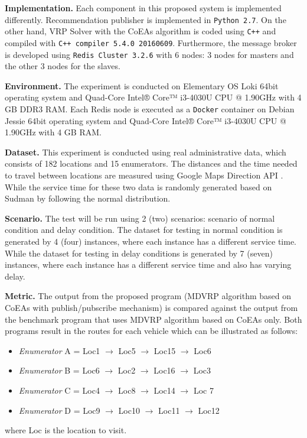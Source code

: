 \documentclass[conference]{IEEEtran}
\begin{document}
\textbf{Implementation.} Each component in this proposed system is implemented differently. Recommendation publisher is implemented in \verb!Python 2.7!. On the other hand, VRP Solver with the CoEAs algorithm is coded using \verb!C++! and compiled with \verb!C++ compiler 5.4.0 20160609!. Furthermore, the message broker is developed using \verb|Redis Cluster 3.2.6| with 6 nodes: 3 nodes for masters and the other 3 nodes for the slaves.

\textbf{Environment.} The experiment is conducted on Elementary OS Loki 64bit operating system and Quad-Core Intel® Core™ i3-4030U CPU @ 1.90GHz with 4 GB DDR3 RAM. Each Redis node is executed as a \verb|Docker| container on Debian Jessie 64bit operating system and Quad-Core Intel® Core™ i3-4030U CPU @ 1.90GHz with 4 GB RAM.

\textbf{Dataset.} This experiment is conducted using real administrative data, which consists of 182 locations and 15 enumerators. The distances and the time needed to travel between locations are measured using Google Maps Direction API \cite{google_google_2016}. While the service time for these two data is randomly generated based on Sudman \cite{sudman_time_1965} by following the normal distribution.

\textbf{Scenario.} The test will be run using 2 (two) scenarios: scenario of normal condition and delay condition. The dataset for testing in normal condition is generated by 4 (four) instances, where each instance has a different service time. While the dataset for testing in delay conditions is generated by 7 (seven) instances, where each instance has a different service time and also has varying delay.

\textbf{Metric.} The output from the proposed program (MDVRP algorithm based on CoEAs with publish/pubscribe mechanism) is compared against the output from the benchmark program that uses MDVRP algorithm based on CoEAs only. Both programs result in the routes for each vehicle which can be illustrated as follows:

\begin{itemize}
\item \textit{Enumerator} A = Loc1 $\rightarrow$ Loc5 $\rightarrow$ Loc15 $\rightarrow$ Loc6
\item \textit{Enumerator} B = Loc6 $\rightarrow$ Loc2 $\rightarrow$ Loc16 $\rightarrow$ Loc3
\item \textit{Enumerator} C = Loc4 $\rightarrow$ Loc8 $\rightarrow$ Loc14 $\rightarrow$ Loc 7
\item \textit{Enumerator} D = Loc9 $\rightarrow$ Loc10 $\rightarrow$ Loc11 $\rightarrow$ Loc12
\end{itemize}
where Loc is the location to visit. 
\end{document}
